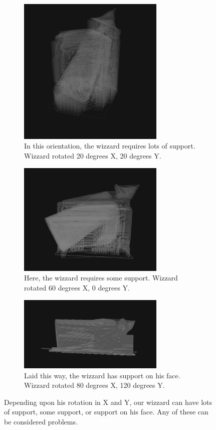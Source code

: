 \documentclass{sigchi}
\begin{document}
\begin{figure}
        \centering
        \begin{subfigure}[b]{0.3\textwidth}
                \includegraphics[width=2.75in]{images/wizzard-lotssupport}
                \caption{In this orientation, the wizzard requires lots of support.  Wizzard rotated 20 degrees X, 20 degrees Y.}
                \label{fig:lots}
        \end{subfigure}
        \begin{subfigure}[b]{0.3\textwidth}
                \includegraphics[width=2.75in]{images/wizzard-somesupport}
                \caption{Here, the wizzard requires some support.  Wizzard rotated 60 degrees X, 0 degrees Y.}
                \label{fig:some}
        \end{subfigure}
        \begin{subfigure}[b]{0.3\textwidth}
                \includegraphics[width=2.75in]{images/wizzard-facesupport}
                \caption{Laid this way, the wizzard has support on his face.  Wizzard rotated 80 degrees X, 120 degrees Y.}
                \label{fig:face}
        \end{subfigure}
        \caption{Depending upon his rotation in X and Y, our wizzard can have lots of support, some support, or support on his face.  Any of these can be considered problems.}\label{fig:rotations}
\end{figure}
\end{document}
